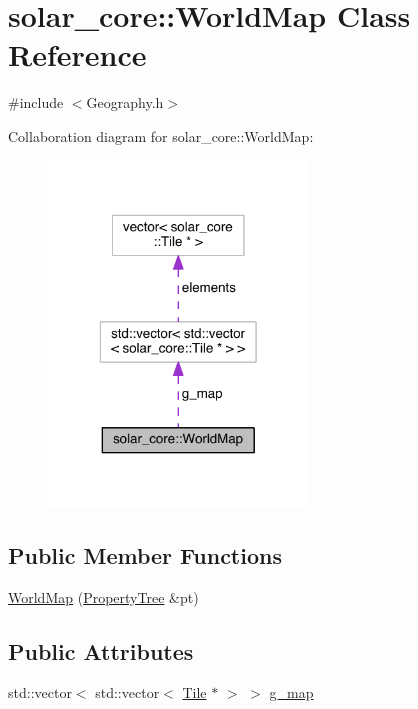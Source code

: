 \hypertarget{classsolar__core_1_1_world_map}{}\section{solar\+\_\+core\+:\+:World\+Map Class Reference}
\label{classsolar__core_1_1_world_map}


{\ttfamily \#include $<$Geography.\+h$>$}



Collaboration diagram for solar\+\_\+core\+:\+:World\+Map\+:\nopagebreak
\begin{figure}[H]
\begin{center}
\leavevmode
\includegraphics[width=196pt]{classsolar__core_1_1_world_map__coll__graph}
\end{center}
\end{figure}
\subsection*{Public Member Functions}
\begin{DoxyCompactItemize}
\item 
\hyperlink{classsolar__core_1_1_world_map_adb4ade0405f6de1affb3f413496b4dd6}{World\+Map} (\hyperlink{namespacesolar__core_adeda2737d6938c190eb774a5b2495045}{Property\+Tree} \&pt)
\end{DoxyCompactItemize}
\subsection*{Public Attributes}
\begin{DoxyCompactItemize}
\item 
std\+::vector$<$ std\+::vector$<$ \hyperlink{classsolar__core_1_1_tile}{Tile} $\ast$ $>$ $>$ \hyperlink{classsolar__core_1_1_world_map_a2b94f74fcea57d3e01d8cab8348e1c48}{g\+\_\+map}
\end{DoxyCompactItemize}


